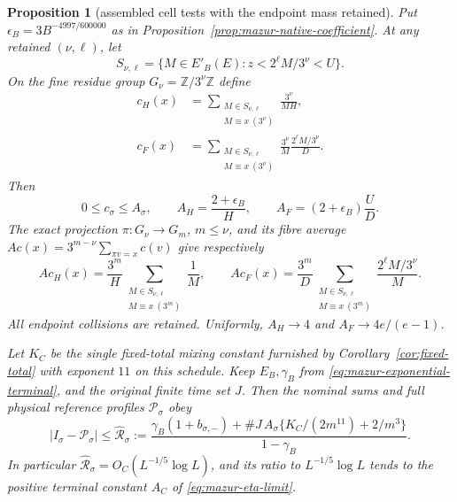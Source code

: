 \documentclass[11pt]{article}
\newtheorem{proposition}{Proposition}
\theoremstyle{remark}\newtheorem{remark}[proposition]{Remark}
\begin{document}
\begin{proposition}[assembled cell tests with the endpoint mass retained]
\label{prop:mazur-genuine-caps}
Put $\epsilon_B=3B^{-4997/600000}$ as in
Proposition~\ref{prop:mazur-native-coefficient}. At any retained
$(\nu,\ell)$, let
\[
 S_{\nu,\ell}=\{M\in E'_B(E):z<2^\ell M/3^\nu<U\}.
\]
On the fine residue group $G_\nu=\mathbb Z/3^\nu\mathbb Z$ define
\begin{align*}
 c_H(x)&=\sum_{\substack{M\in S_{\nu,\ell}\\M\equiv x\ (3^\nu)}}
                       \frac{3^\nu}{MH},\\
 c_F(x)&=\sum_{\substack{M\in S_{\nu,\ell}\\M\equiv x\ (3^\nu)}}
                       \frac{3^\nu}{M}\frac{2^\ell M/3^\nu}{D}.
\end{align*}
Then
\begin{equation}
 0\le c_\sigma\le A_\sigma,\qquad
 A_H=\frac{2+\epsilon_B}{H},\qquad
 A_F=(2+\epsilon_B)\frac UD .
 \label{eq:mazur-genuine-caps}
\end{equation}
The exact projection $\pi:G_\nu\to G_m$, $m\le\nu$, and its fibre average
$Ac(x)=3^{m-\nu}\sum_{\pi v=x}c(v)$ give respectively
\[
 Ac_H(x)=\frac{3^m}H
       \sum_{\substack{M\in S_{\nu,\ell}\\M\equiv x\ (3^m)}}\frac1M,\qquad
 Ac_F(x)=\frac{3^m}D
       \sum_{\substack{M\in S_{\nu,\ell}\\M\equiv x\ (3^m)}}
                       \frac{2^\ell M/3^\nu}{M}.
\]
All endpoint collisions are retained. Uniformly,
$A_H\to4$ and $A_F\to4e/(e-1)$.

Let $K_C$ be the single fixed-total mixing constant furnished by
Corollary~\ref{cor:fixed-total} with exponent $11$ on this schedule.
Keep $E_B,\gamma_B$ from \eqref{eq:mazur-exponential-terminal}, and
the original finite time set $J$. Then the nominal sums and full physical
reference profiles $\mathcal P_\sigma$ obey
\begin{equation}
 |I_\sigma-\mathcal P_\sigma|
 \le\widehat{\mathcal R}_\sigma:=
 \frac{\gamma_B(1+b_{\sigma,-})+
   \#J\,A_\sigma\{K_C/(2m^{11})+2/m^3\}}{1-\gamma_B}.
 \label{eq:mazur-genuine-terminal}
\end{equation}
In particular $\widehat{\mathcal R}_\sigma=O_C(L^{-1/5}\log L)$,
and its ratio to $L^{-1/5}\log L$ tends to the positive terminal
constant $A_C$ of \eqref{eq:mazur-eta-limit}.
\end{proposition}
\end{document}
